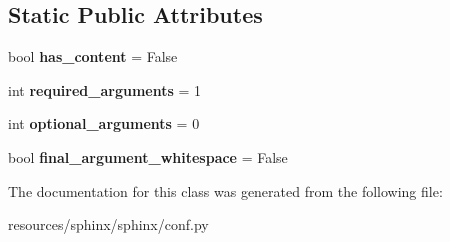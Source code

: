 \subsection*{Static Public Attributes}
\begin{DoxyCompactItemize}
\item 
\mbox{\label{classconf_1_1SetMode_ae1125c2c8ac3569a9e7189eaf36224ba}} 
bool {\bfseries has\+\_\+content} = False
\item 
\mbox{\label{classconf_1_1SetMode_a33f8f61daab34475f5af93e15a3e3b5d}} 
int {\bfseries required\+\_\+arguments} = 1
\item 
\mbox{\label{classconf_1_1SetMode_abea8b1a21182e57d44ec6d36a1beac10}} 
int {\bfseries optional\+\_\+arguments} = 0
\item 
\mbox{\label{classconf_1_1SetMode_a36cbd9320be885e5e096a5a4a3b065fd}} 
bool {\bfseries final\+\_\+argument\+\_\+whitespace} = False
\end{DoxyCompactItemize}


The documentation for this class was generated from the following file\+:\begin{DoxyCompactItemize}
\item 
resources/sphinx/sphinx/conf.\+py\end{DoxyCompactItemize}
